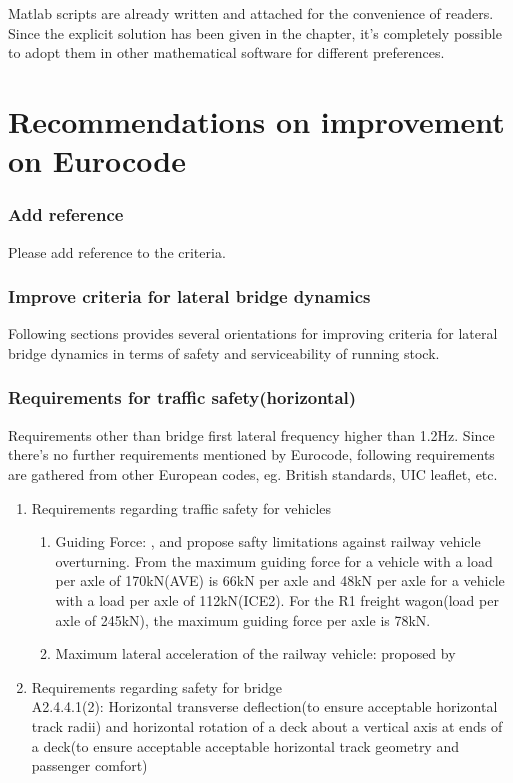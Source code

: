 Matlab scripts are already written and attached for the convenience of readers. Since the explicit solution has been given in the chapter, it's completely possible to adopt them in other mathematical software for different preferences.


\chapter{Recommendations on improvement on Eurocode}


\subsection{Add reference}
Please add reference to the criteria.

\subsection{Improve criteria for lateral bridge dynamics}
Following sections provides several orientations for improving criteria for lateral bridge dynamics in terms of safety and serviceability of running stock.


\subsection{Requirements for traffic safety(horizontal)}
Requirements other than bridge first lateral frequency higher than 1.2Hz. Since there's no further requirements mentioned by Eurocode, following requirements are gathered from other European codes, eg. British standards, UIC leaflet, etc.

\begin{enumerate}[-]
    \item Requirements regarding traffic safety for vehicles
    \begin{enumerate}
        \item Guiding Force: \cite{code2005518} , \cite{en200714363} and\cite{cuadrado2008analysis} propose safty limitations against railway vehicle overturning. From\cite{en200714363} the maximum guiding force for a vehicle with a load per axle of 170kN(AVE) is 66kN per axle and 48kN per axle for a vehicle with a load per axle of 112kN(ICE2). For the R1 freight wagon(load per axle of 245kN), the maximum guiding force per axle is 78kN.
        \item Maximum lateral acceleration of the railway vehicle: proposed by \cite{13803}
    \end{enumerate}
    \item Requirements regarding safety for bridge\\
    \cite{EC0} A2.4.4.1(2): Horizontal transverse deflection(to ensure acceptable horizontal track radii) and horizontal rotation of a deck about a vertical axis at ends of a deck(to ensure acceptable acceptable horizontal track geometry and passenger comfort)
\end{enumerate}


